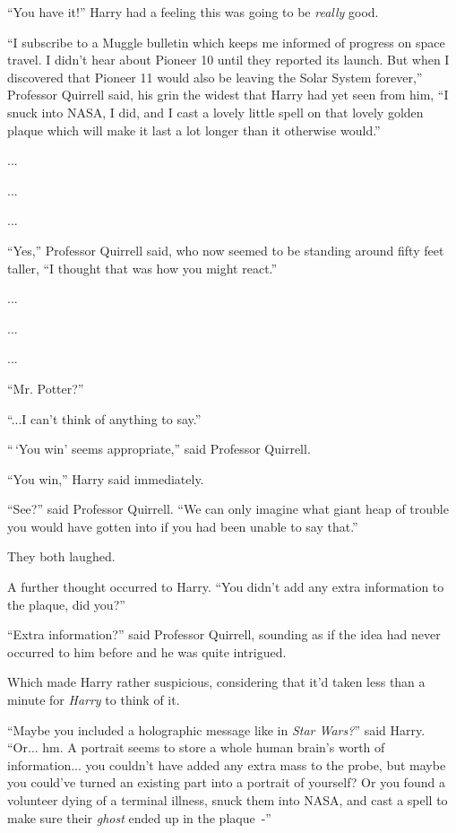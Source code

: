 ``You have it!'' Harry had a feeling this was going to be \emph{really} good.

``I subscribe to a Muggle bulletin which keeps me informed of progress on space travel. I didn't hear about Pioneer 10 until they reported its launch. But when I discovered that Pioneer 11 would also be leaving the Solar System forever,'' Professor Quirrell said, his grin the widest that Harry had yet seen from him, ``I snuck into NASA, I did, and I cast a lovely little spell on that lovely golden plaque which will make it last a lot longer than it otherwise would.''

...

...

...

``Yes,'' Professor Quirrell said, who now seemed to be standing around fifty feet taller, ``I thought that was how you might react.''

...

...

...

``Mr. Potter?''

``...I can't think of anything to say.''

``\,`You win' seems appropriate,'' said Professor Quirrell.

``You win,'' Harry said immediately.

``See?'' said Professor Quirrell. ``We can only imagine what giant heap of trouble you would have gotten into if you had been unable to say that.''

They both laughed.

A further thought occurred to Harry. ``You didn't add any extra information to the plaque, did you?''

``Extra information?'' said Professor Quirrell, sounding as if the idea had never occurred to him before and he was quite intrigued.

Which made Harry rather suspicious, considering that it'd taken less than a minute for \emph{Harry} to think of it.

``Maybe you included a holographic message like in \emph{Star Wars?}'' said Harry. ``Or... hm. A portrait seems to store a whole human brain's worth of information... you couldn't have added any extra mass to the probe, but maybe you could've turned an existing part into a portrait of yourself? Or you found a volunteer dying of a terminal illness, snuck them into NASA, and cast a spell to make sure their \emph{ghost} ended up in the plaque~-''

